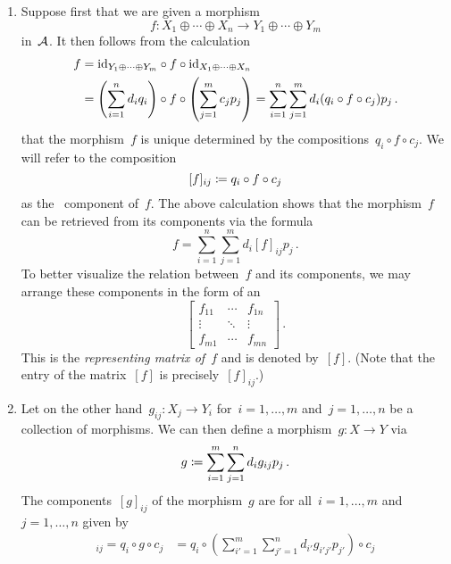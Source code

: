 \begin{remark*}
  \begin{enumerate}
    \item
      Suppose first that we are given a morphism
      \[
                f
        \colon  X_1 \oplus \dotsb \oplus X_n
        \to     Y_1 \oplus \dotsb \oplus Y_m
      \]
      in~$\mathcal{A}$.
      It then follows from the calculation
      \begin{align*}
            f
        &=  {\operatorname{id}_{Y_1 \oplus \dotsb \oplus Y_m}} \circ f \circ {\operatorname{id}_{X_1 \oplus \dotsb \oplus X_n}} \\
        &=  \left( \sum_{i=1}^n d_i q_i \right) \circ f \circ \left( \sum_{j=1}^m c_j p_j \right)
        =  \sum_{i=1}^n \sum_{j=1}^m d_i (q_i \circ f \circ c_j) p_j \,.
      \end{align*}
      that the morphism~$f$ is unique determined by the compositions~$q_i \circ f \circ c_j$.
      We will refer to the composition
      \[
                  [f]_{ij}
        \coloneqq  q_i \circ f \circ c_j
      \]
      as the~ component of~$f$.
      The above calculation shows that the morphism~$f$ can be retrieved from its components via the formula
      \[
        f = \sum_{i=1}^n \sum_{j=1}^m d_i [f]_{ij} p_j \,.
      \]
      To better visualize the relation between~$f$ and its components, we may arrange these components in the form of an~
      \[
        \begin{bmatrix}
          f_{11}  & \cdots  & f_{1n}  \\
          \vdots  & \ddots  & \vdots  \\
          f_{m1}  & \cdots  & f_{mn}
        \end{bmatrix} \,.
      \]
      This is the \emph{representing matrix of~$f$} and is denoted by~$[f]$.
      (Note that the~ entry of the matrix~$[f]$ is precisely~$[f]_{ij}$.)
    \item
      Let on the other hand~$g_{ij} \colon X_j \to Y_i$ for~$i = 1, \dotsc, m$ and~$j = 1, \dotsc, n$ be a collection of morphisms.
      We can then define a morphism~$g \colon X \to Y$ via
      \[
                  g
        \coloneqq  \sum_{i=1}^m \sum_{j=1}^n d_i g_{ij} p_j \,.
      \]
      The components~$[g]_{ij}$ of the morphism~$g$ are for all~$i = 1, \dotsc, m$ and~$j = 1, \dotsc, n$ given by
      \begin{align*}
            [g]_{ij}
        =  q_i \circ g \circ c_j
        &=  q_i \circ \left( \sum_{i'=1}^m \sum_{j'=1}^n d_{i'} g_{i'j'} p_{j'} \right) \circ c_j \\

\end{align*}
\end{enumerate}
\end{remark*}
